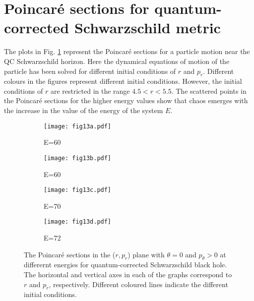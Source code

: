 \documentclass[aps,prd,showpacs,nofootinbib,floats,floatfix,preprintnumbers,groupedaddress,twocolumn]{revtex4-1}
\begin{document}
\section{{\label{App1}}Poincar\'e sections for quantum-corrected Schwarzschild metric}
%
%
%
\par\noindent
The  plots in Fig. \ref{fig:13} represent the Poincar\'e sections for a particle motion near the QC Schwarzschild horizon. Here the dynamical equations of motion of the particle has been solved for different initial conditions of $r$ and $p_r$. Different colours in the figures represent different initial conditions. However, the initial conditions of $r$ are restricted in the range $4.5<r<5.5$. The scattered points in the Poincar\'e sections for the higher energy values show that chaos emerges with the increase in the value of the energy of the system $E$. 
%
\begin{figure}[h!]
		\centering
		\begin{subfigure}[b]{0.49\linewidth}
			\texttt{[image: fig13a.pdf]}
			\caption{E=60}
		\end{subfigure}
		\begin{subfigure}[b]{0.49\linewidth}
			\texttt{[image: fig13b.pdf]}
			\caption{E=60}
		\end{subfigure}
		
		\begin{subfigure}[b]{0.49\linewidth}
			\texttt{[image: fig13c.pdf]}
			\caption{E=70}
		\end{subfigure}
		\begin{subfigure}[b]{0.49\linewidth}
			\texttt{[image: fig13d.pdf]}
			\caption{E=72}
		\end{subfigure}
		\caption{The Poincar\'e sections in the ($r,p_r$) plane with $\theta = 0$ and $p_\theta > 0$ at differernt energies for quantum-corrected Schwarzschild black hole. The horizontal and vertical axes in each of the graphs correspond to $r$ and $p_r$, respectively. Different coloured lines indicate the different initial conditions. }
		\label{fig:13}
\end{figure}
%
%
%
%
\end{document}
